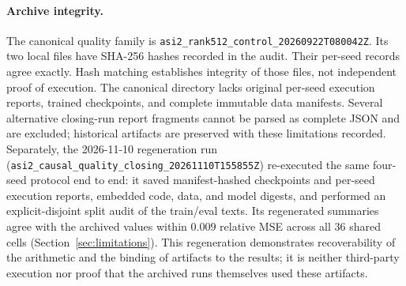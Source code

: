 \paragraph{Archive integrity.}
The canonical quality family is
\texttt{asi2\_rank512\_control\_20260922T080042Z}. Its two local files have
SHA-256 hashes recorded in the audit. Their per-seed records agree exactly.
Hash matching establishes integrity of those files, not independent proof of
execution. The canonical directory lacks original per-seed execution reports,
trained checkpoints, and complete immutable data manifests. Several alternative
closing-run report fragments cannot be parsed as complete JSON and are excluded;
historical artifacts are preserved with these limitations recorded.
Separately, the 2026-11-10 regeneration run
(\texttt{asi2\_causal\_quality\_closing\_20261110T155855Z}) re-executed the
same four-seed protocol end to end: it saved manifest-hashed checkpoints and
per-seed execution reports, embedded code, data, and model digests, and
performed an explicit-disjoint split audit of the train/eval texts. Its
regenerated summaries agree with the archived values within $0.009$ relative
MSE across all $36$ shared cells (Section~\ref{sec:limitations}). This
regeneration demonstrates recoverability of the arithmetic and the binding of
artifacts to the results; it is neither third-party execution nor proof that
the archived runs themselves used these artifacts.

